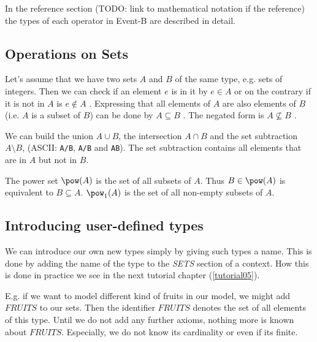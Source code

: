 
In the reference section (TODO: link to mathematical notation if the reference) the types of each operator in Event-B are described in detail.

\subsection{Operations on Sets}
\label{tut:operations_on_sets}
Let's assume that we have two sets $A$ and $B$ of the same type, e.g. sets of integers.
Then we can check if an element $e$ is in it by $e\in A$  or 
on the contrary if it is not in $A$ is $e\notin A$ .
Expressing that all elements of $A$ are also elements of $B$ (i.e. $A$ is a subset of $B$) can
be done by $A\subseteq B$ . The negated form is $A\not\subseteq B$ .

We can build the union $A\cup B$, the intersection $A\cap B$ and the set subtraction $A\setminus B$,
(ASCII: \texttt{A\mybackslash{}/B}, \texttt{A/\mybackslash{}B} and \texttt{A\mybackslash{}B}). The
set subtraction contains all elements that are in $A$ but not in $B$.

The power set $\pow(A)$  is the set of all subsets of $A$.
Thus $B\in\pow(A)$ is equivalent to $B\subseteq A$.
$\pow_1(A)$  is the set of all non-empty subsets of $A$.

\subsection{Introducing user-defined types}
\label{tut:deferred_sets}

We can introduce our own new types simply by giving such types a name.
This is done by adding the name of the type to the \textsl{SETS} section of a context.
How this is done in practice we see in the next tutorial chapter (\ref{tutorial05}).

E.g. if we want to model different kind of fruits in our model, we might add $FRUITS$ to our
sets. Then the identifier $FRUITS$ denotes the set of all elements of this type. Until we
do not add any further axioms, nothing more is known about $FRUITS$.  Especially, we do not
know its cardinality or even if its finite.

